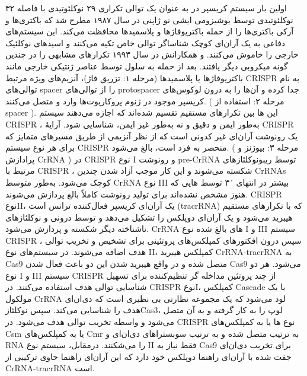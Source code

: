\documentclass[12pt,a4paper,BCOR=.7cm,headsepline,bibliography=totoc]{report}
\begin{document}
اولین بار سیستم کریسپر در
 به عنوان یک توالی تکراری ۲۹ نوکلئوتیدی با فاصله ۳۲ نوکلئوتیدی توسط یوشیزومی ایشی نو ژاپنی در سال ۱۹۸۷ مطرح شد که باکتری‌ها و آرکی باکتری‌ها را از حمله باکتریوفاژها و پلاسمیدها محافظت می‌کند. این سیستم‌های دفاعی به یک آر‌ان‌ای کوچک شناساگر توالی خاص تکیه می‌کنند و اسیدهای نوکلئیک خارجی را خاموش می‌کنند.
\cite{Ishino} 
 و همکارانش در سال ۱۹۹۳ تکرارهای مشابهی را در چندین گونه میکروبی دیگر یافتند.\cite{Mojica}
بعد از حمله به سلول توسط عناصر ژنتیکی خارجی مانند باکتریوفاژها یا پلاسمیدها (مرحله ۱: تزریق فاژ)، آنزیم‌های ویژه مرتبط CRISPR
 به نام
 توالی‌های spacer را از توالی‌های protospacer جدا کرده و آن‌ها را به درون لوکوس‌های کریسپر موجود در ژنوم پروکاریوت‌ها وارد و متصل می‌کنند. ( مرحله ۲: استفاده از spacer ). این 
ها
 بین تکرارهای مستقیم تقسیم شده‌اند که اجازه می‌دهند سیستم CRISPR ، به‌طور ایمن و دقیق و نه به‌طور غیر ایمن، شناسایی شود. آرایهٔ CRISPR یک رونوشت آر‌ان‌ای غیر کدونی است که از نظر آنزیمی از طریق مسیرهای متمایز که برای هر نوع سیستم CRISPR منحصر به فرد است، بالغ می‌شود. ( مرحله ۳: بیوژنز و پرادازش CrRNA ) در CRISPR نوع I و
رونوشت pre-CrRNA توسط ریبونوکلئازهای مرتبط با CRISPR ، شکسته می‌شوند و این کار موجب آزاد شدن چندین CrRNAs کوچک می‌شود. به‌طور متوسط CrRNA نوع III بیشتر در انتهای ´۳ توسط
 هایی 
که هنوز مشخص نشده‌اند برای تولید رونوشت کاملاً بالغ پردازش می‌شوند. CRISPR نوعII، یک آر‌ان‌ای کریسپر فعال‌کننده ترانس است (tracrRNA) که با تکرارهای مستقیم هیبرید می‌شود و یک آر‌ان‌ای دوپلکس را تشکیل می‌دهد و توسط 
 درونی و نوکلئازهای ناشناخته دیگر شکسته و پردازش می‌شود. CrRNA های بالغ شده نوع I و III سیستم CRISPR ، سپس درون افکتورهای کمپلکس‌های پروتئینی برای تشخیص و تخریب توالی هدف اضافه می‌شوند. در سیستم‌های نوع II، کمپلکس هیبرید CrRNA-tracrRNA به Cas9 متصل شده و در واقع هیبرید شدن این دو باعث فعال شدن Cas9 می‌شود. هر دو نوع I و III سیستم CRISPR از چند پروتئین مداخله گر تنظیم‌کننده برای تسهیل شناسایی توالی هدف استفاده می‌کنند. در CRISPR نوعI، کمپلکس Cascade با یک مولکول CrRNA لود می‌شود که یک مجموعه نظارتی بی نظیری است که دی‌ان‌ای هدف را شناسایی می‌کند. سپس نوکلئازCas3، لوپ  را به کار گرفته و به آن متصل می‌شود و واسطه تخریب توالی هدف می‌شود. در CRISPR نوع ها یا به کمپلکس‌های Csm یا به کمپلکس‌های Cmr به ترتیب متصل شده و به ترتیب سوبستراهای دی‌ان‌ای و RNA را می‌شکنند. درمقابل، سیستم نوع II فقط نیاز به Cas9 برای تخریب دی‌ان‌ای جفت شده با آر‌ان‌ای راهنما دوپلکس خود دارد که این آر‌ان‌ای راهنما حاوی ترکیبی از CrRNA-tracrRNA است.
\end{document}

